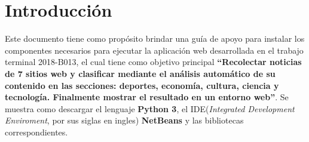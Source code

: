 \section{Introducción}

Este documento tiene como propósito brindar una guía de apoyo para instalar los componentes necesarios para ejecutar la aplicación web desarrollada en el trabajo terminal 2018-B013, el cual tiene como objetivo principal \textbf{``Recolectar noticias de 7 sitios web y clasificar mediante el análisis automático de su contenido en las secciones: deportes, economía, cultura, ciencia y tecnología. Finalmente mostrar el resultado en un entorno web''}. Se muestra como descargar el lenguaje \textbf{Python 3}, el IDE(\textit{Integrated Development Enviroment}, por sus siglas en ingles) \textbf{NetBeans} y las bibliotecas correspondientes. 

